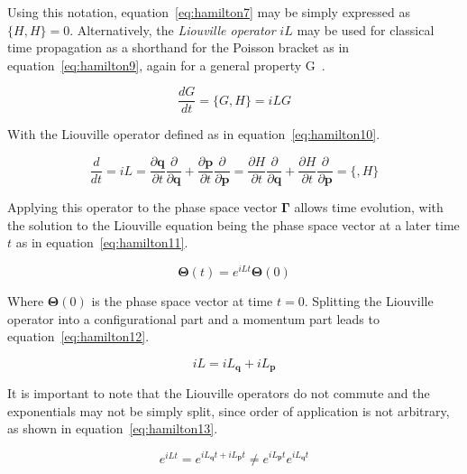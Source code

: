 \documentclass[12pt]{article}
\begin{document}
\bigskip

\noindent Using this notation, equation~\ref{eq:hamilton7} may be simply expressed as $\{H, H\} = 0$. Alternatively, the \textit{Liouville operator} $iL$ may be used for classical time propagation as a shorthand for the Poisson bracket as in equation~\ref{eq:hamilton9}, again for a general property G~\cite{Frenkel1997}.

\begin{equation}
  \frac{dG}{dt} = \{G, H\} = iLG
  \label{eq:hamilton9}
\end{equation}

\bigskip

\noindent With the Liouville operator defined as in equation~\ref{eq:hamilton10}.

\begin{equation}
  \frac{d}{dt} = iL = \frac{\partial \textbf{q}}{\partial t} \frac{\partial}{\partial \textbf{q}} + \frac{\partial \textbf{p}}{\partial t} \frac{\partial}{\partial \textbf{p} } = \frac{\partial H}{\partial t} \frac{\partial}{\partial \textbf{q}} + \frac{\partial H}{\partial t} \frac{\partial}{\partial \textbf{p} } = \{, H\}
  \label{eq:hamilton10}
\end{equation}

\bigskip

\noindent Applying this operator to the phase space vector $\mathbf{\Gamma}$ allows time evolution, with the solution to the Liouville equation being the phase space vector at a later time $t$ as in equation~\ref{eq:hamilton11}.

\begin{equation}
  \mathbf{\Theta}(t) = e^{iLt}\mathbf{\Theta}(0)
  \label{eq:hamilton11}
\end{equation}

\bigskip

\noindent Where $\mathbf{\Theta}(0)$ is the phase space vector at time $t=0$. Splitting the Liouville operator into a configurational part and a momentum part leads to  equation~\ref{eq:hamilton12}.


\begin{equation}
  iL = iL_{\textbf{q}} + iL_{\textbf{p}}
  \label{eq:hamilton12}
\end{equation}

\bigskip

\noindent It is important to note that the Liouville operators do not commute and the exponentials may not be simply split, since order of application is not arbitrary, as shown in equation~\ref{eq:hamilton13}.

\begin{equation}
  e^{iLt} = e^{iL_{\textbf{q}}t + iL_{\textbf{p}}t} \neq e^{iL_{\textbf{p}}t}e^{iL_{\textbf{q}}t}
  \label{eq:hamilton13}
\end{equation}


\end{document}
